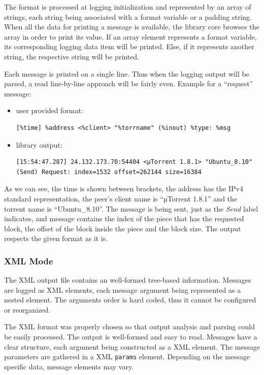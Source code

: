 The format is processed at logging initialization and represented by an array
of strings, each string being associated with a format variable or a padding
string. When all the data for printing a message is available, the library
core browses the array in order to print its value. If an array element
represents a format variable, its corresponding logging data item will be
printed. Else, if it represents another string, the respective string will be
printed.

Each message is printed on a single line. Thus when the logging output will be
parsed, a read line-by-line approach will be fairly even. Example for a
``request'' message:

\begin{itemize}
  \item user provided format:
    \begin{verbatim}
[%time] %address <%client> "%torrname" (%inout) %type: %msg
    \end{verbatim}
  \item library output:
    \begin{verbatim}
[15:54:47.287] 24.132.173.70:54404 <µTorrent 1.8.1> "Ubuntu_8.10"
(Send) Request: index=1532 offset=262144 size=16384
    \end{verbatim}
\end{itemize}

As we can see, the time is shown between brackets, the address has the IPv4
standard representation, the peer's client name is ``µTorrent 1.8.1'' and the
torrent name is ``Ubuntu\_8.10''. The message is being sent, just as the
\textit{Send} label indicates, and message contains the index of the piece
that has the requested block, the offset of the block inside the piece and the
block size.  The output respects the given format as it is.

\subsubsection{XML Mode}

The XML output file contains an well-formed tree-based information. Messages
are logged as XML elements, each message argument being represented as a
nested element. The arguments order is hard coded, thus it cannot be configured
or reorganized.

The XML format was properly chosen so that output analysis and parsing could
be easily processed. The output is well-formed and easy to read. Messages have
a clear structure, each argument being constructed as  a XML element. The
message parameters are gathered in a XML \texttt{params} element. Depending on
the message specific data, message elements may vary.

